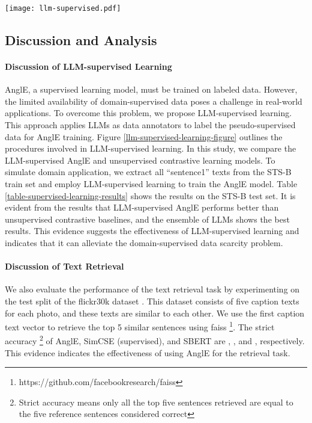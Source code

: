 \documentclass{article} \usepackage{iclr2024_conference,times}
\begin{document}
\begin{figure*}[ht]
    \centering
    \texttt{[image: llm-supervised.pdf]}
    \caption{The procedures of the LLM-supervised learning. For the STS task, we use the prompt ``\textit{You are a highly smart same-meaning/opposite-meaning sentence-generating system. Your job is to generate \{size\} synonymous/antonym sentences of a given input sentence. Input sentence: \{text\}. Output:}'' to generate positive/negative pairs. \{size\} and \{text\} are placeholders for the generated size and the input text, respectively.}
    \label{llm-supervised-learning-figure}
\end{figure*}

\subsection{Discussion and Analysis}

\paragraph{Discussion of LLM-supervised Learning}
AnglE, a supervised learning model, must be trained on labeled data. However, the limited availability of domain-supervised data poses a challenge in real-world applications. To overcome this problem, we propose LLM-supervised learning. This approach applies LLMs as data annotators to label the pseudo-supervised data for AnglE training. Figure \ref{llm-supervised-learning-figure} outlines the procedures involved in LLM-supervised learning. In this study, we compare the LLM-supervised AnglE and unsupervised contrastive learning models. To simulate domain application, we extract all ``sentence1'' texts from the STS-B train set and employ LLM-supervised learning to train the AnglE model. Table \ref{table-supervised-learning-results} shows the results on the STS-B test set. It is evident from the results that LLM-supervised AnglE performs better than unsupervised contrastive baselines, and the ensemble of LLMs shows the best results.
This evidence suggests the effectiveness of LLM-supervised learning and indicates that it can alleviate the domain-supervised data scarcity problem.

\paragraph{Discussion of Text Retrieval}
\label{sec-long-text-retrieval}
We also evaluate the performance of the text retrieval task by experimenting on the test split of the flickr30k dataset \citep{young-etal-2014-image}. This dataset consists of five caption texts for each photo, and these texts are similar to each other. We use the first caption text vector to retrieve the top 5 similar sentences using faiss \footnote{https://github.com/facebookresearch/faiss}. The strict accuracy \footnote{Strict accuracy means only all the top five sentences retrieved are equal to the five reference sentences considered correct} of AnglE, SimCSE (supervised), and SBERT are , , and , respectively. This evidence indicates the effectiveness of using AnglE for the retrieval task. 
\end{document}
